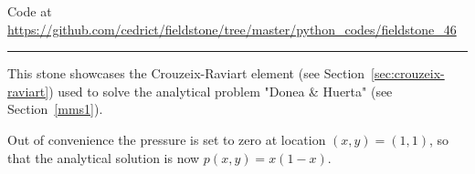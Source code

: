 

\begin{center}
Code at \url{https://github.com/cedrict/fieldstone/tree/master/python_codes/fieldstone_46}
\end{center}

\par\noindent\rule{\textwidth}{0.4pt}

This stone showcases the Crouzeix-Raviart element (see Section~\ref{sec:crouzeix-raviart})
used to solve the analytical problem "Donea \& Huerta" (see Section~\ref{mms1}).

Out of convenience the pressure is set to zero at location $(x,y)=(1,1)$, so that the 
analytical solution is now $p(x,y)=x(1-x)$. 

